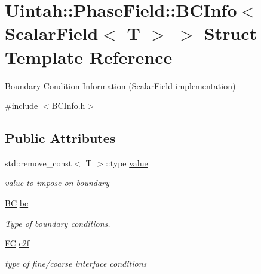 \hypertarget{structUintah_1_1PhaseField_1_1BCInfo_3_01ScalarField_3_01T_01_4_01_4}{}\section{Uintah\+:\+:Phase\+Field\+:\+:B\+C\+Info$<$ Scalar\+Field$<$ T $>$ $>$ Struct Template Reference}
\label{structUintah_1_1PhaseField_1_1BCInfo_3_01ScalarField_3_01T_01_4_01_4}


Boundary Condition Information (\hyperlink{structUintah_1_1PhaseField_1_1ScalarField}{Scalar\+Field} implementation)  




{\ttfamily \#include $<$B\+C\+Info.\+h$>$}

\subsection*{Public Attributes}
\begin{DoxyCompactItemize}
\item 
std\+::remove\+\_\+const$<$ T $>$\+::type \hyperlink{structUintah_1_1PhaseField_1_1BCInfo_3_01ScalarField_3_01T_01_4_01_4_a5966d1046d646fa0bf0a2abbff927ce6}{value}
\begin{DoxyCompactList}\small\item\em value to impose on boundary \end{DoxyCompactList}\item 
\hyperlink{namespaceUintah_1_1PhaseField_a148fba372aa3be96fd6eede7a2fa10b5}{BC} \hyperlink{structUintah_1_1PhaseField_1_1BCInfo_3_01ScalarField_3_01T_01_4_01_4_ae9766432d25bb51969514416b541ba2c}{bc}
\begin{DoxyCompactList}\small\item\em Type of boundary conditions. \end{DoxyCompactList}\item 
\hyperlink{namespaceUintah_1_1PhaseField_aeb51fe956fe07f1487f5878f4039f27c}{FC} \hyperlink{structUintah_1_1PhaseField_1_1BCInfo_3_01ScalarField_3_01T_01_4_01_4_a6418f823c0e3c123aaacc573b04cb5ff}{c2f}
\begin{DoxyCompactList}\small\item\em type of fine/coarse interface conditions \end{DoxyCompactList}\end{DoxyCompactItemize}


